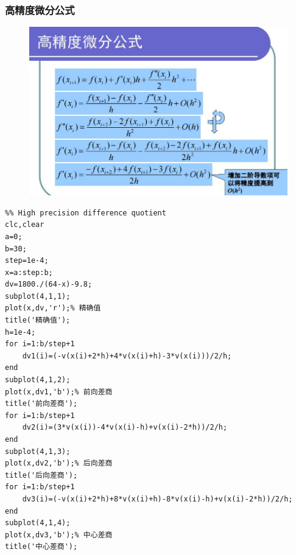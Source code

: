 \documentclass[a4paper,12pt]{ctexart}
\begin{document}
\subsubsection{高精度微分公式}
\begin{figure}[H]
    \centering
    \includegraphics[width=14cm]{第五章作业/gjd.jpg}
\end{figure}
\begin{lstlisting}
%% High precision difference quotient
clc,clear
a=0;
b=30;
step=1e-4;
x=a:step:b;
dv=1800./(64-x)-9.8;
subplot(4,1,1);
plot(x,dv,'r');% 精确值
title('精确值');
h=1e-4;
for i=1:b/step+1
    dv1(i)=(-v(x(i)+2*h)+4*v(x(i)+h)-3*v(x(i)))/2/h;
end
subplot(4,1,2);
plot(x,dv1,'b');% 前向差商
title('前向差商');
for i=1:b/step+1
    dv2(i)=(3*v(x(i))-4*v(x(i)-h)+v(x(i)-2*h))/2/h;
end
subplot(4,1,3);
plot(x,dv2,'b');% 后向差商
title('后向差商');
for i=1:b/step+1
    dv3(i)=(-v(x(i)+2*h)+8*v(x(i)+h)-8*v(x(i)-h)+v(x(i)-2*h))/2/h;
end
subplot(4,1,4);
plot(x,dv3,'b');% 中心差商
title('中心差商');
\end{lstlisting}
\end{document}
